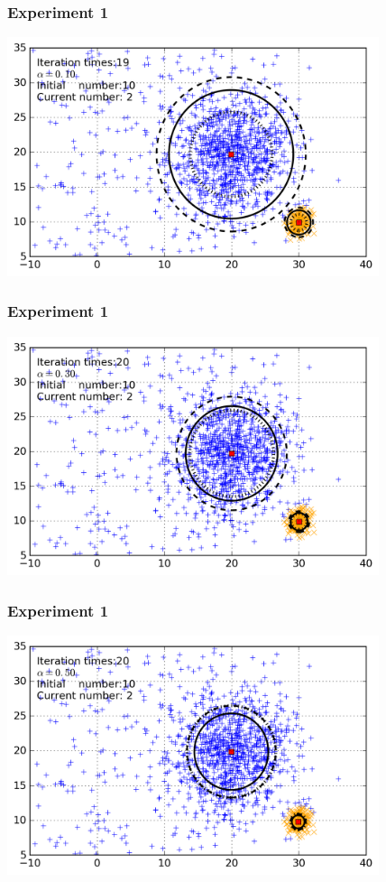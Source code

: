 \documentclass{beamer}
\begin{document}
\begin{frame}
  \frametitle{Experiment 1}
  \includegraphics[height=7cm]{img/small_cluster_structure_preserve_last_frame_n_10_alpha_0_1.png}
\end{frame}

\begin{frame}
  \frametitle{Experiment 1}
  \includegraphics[height=7cm]{img/small_cluster_structure_preserve_last_frame_n_10_alpha_0_3.png}
\end{frame}

\begin{frame}
  \frametitle{Experiment 1}
  \includegraphics[height=7cm]{img/small_cluster_structure_preserve_last_frame_n_10_alpha_0_5.png}
\end{frame}
\end{document}
